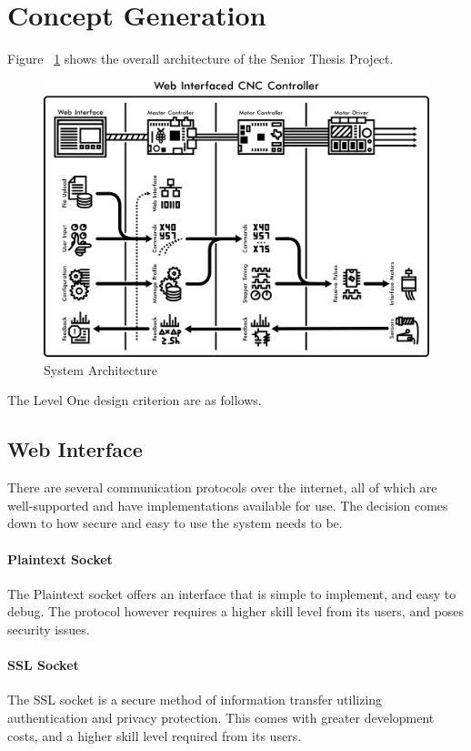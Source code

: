 
\section{Concept Generation}
Figure ~\ref{fig:architecture} shows the overall architecture of the Senior Thesis Project.

\begin{figure}[h]
	\centering
	\includegraphics[width=1\textwidth]{architecture.png}
	\caption{System Architecture}
	\label{fig:architecture}
\end{figure}

The Level One design criterion are as follows. 

\subsection{Web Interface}
There are several communication protocols over the internet, all of which are well-supported and have implementations available for use. 
The decision comes down to how secure and easy to use the system needs to be.

\paragraph{Plaintext Socket} 
The Plaintext socket offers an interface that is simple to implement, and easy to debug.
The protocol however requires a higher skill level from its users, and poses security issues.

\paragraph{SSL Socket} 
The SSL socket is a secure method of information transfer utilizing authentication and privacy protection.
This comes with greater development costs, and a higher skill level required from its users. 

